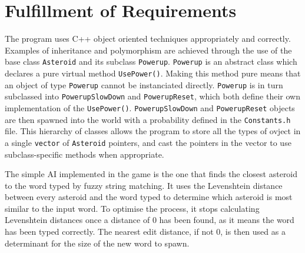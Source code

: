 \documentclass[a4paper,11pt]{article}
\begin{document}
\section{Fulfillment of Requirements}
The program uses C++ object oriented techniques appropriately and correctly.
Examples of inheritance and polymorphism are achieved through the use of the base class \verb|Asteroid| and its subclass \verb|Powerup|. 
\verb|Powerup| is an abstract class which declares a pure virtual method \verb|UsePower()|.
Making this method pure means that an object of type \verb|Powerup| cannot be instanciated directly.
\verb|Powerup| is in turn subclassed into \verb|PowerupSlowDown| and \verb|PowerupReset|, which both define their own implementation of the \verb|UsePower()|.
\verb|PowerupSlowDown| and \verb|PowerupReset| objects are then spawned into the world with a probability defined in the \verb|Constants.h| file.
This hierarchy of classes allows the program to store all the types of ovject in a single \verb|vector| of \verb|Asteroid| pointers, and cast the pointers in the vector to use subclass-specific methods when appropriate.

The simple AI implemented in the game is the one that finds the closest asteroid to the word typed by fuzzy string matching.
It uses the Levenshtein distance between every asteroid and the word typed to determine which asteroid is most similar to the input word.
To optimise the process, it stops calculating Levenshtein distances once a distance of 0 has been found, as it means the word has been typed correctly.
The nearest edit distance, if not 0, is then used as a determinant for the size of the new word to spawn.

\pagebreak
\end{document}
